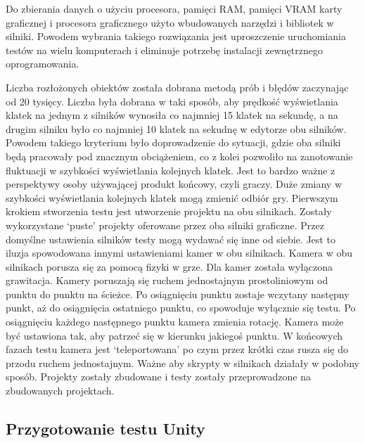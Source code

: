 \documentclass[12pt,twoside]{article}
\begin{document}
Do zbierania danych o użyciu procesora, pamięci RAM, pamięci VRAM karty
graficznej i procesora graficznego użyto wbudowanych narzędzi i bibliotek w
silniki. Powodem wybrania takiego rozwiązania jest uproszczenie uruchomiania
testów na wielu komputerach i eliminuje potrzebę instalacji zewnętrznego
oprogramowania. 


Liczba rozłożonych obiektów została dobrana metodą prób i błędów zaczynając od
20 tysięcy. Liczba była dobrana w taki sposób, aby prędkość wyświetlania klatek
na jednym z silników wynosiła co najmniej 15 klatek na sekundę, a na drugim
silniku było co najmniej 10 klatek na sekudnę w edytorze obu silników. Powodem
takiego kryterium było doprowadzenie do sytuacji, gdzie oba silniki będą
pracowały pod znacznym obciążeniem, co z kolei pozwoliło na zanotowanie
fluktuacji w szybkości wyświetlania kolejnych klatek. Jest to bardzo ważne z
perspektywy osoby używającej produkt końcowy, czyli graczy. Duże zmiany w
szybkości wyświetlania kolejnych klatek mogą zmienić odbiór gry. Pierwszym
krokiem stworzenia testu jest utworzenie projektu na obu silnikach. Zostały
wykorzystane ‘puste’ projekty oferowane przez oba silniki graficzne. Przez
domyślne ustawienia silników testy mogą wydawać się inne od siebie. Jest to
iluzja spowodowana innymi ustawieniami kamer w obu silnikach. Kamera w obu
silnikach porusza się za pomocą fizyki w grze. Dla kamer została wyłączona
grawitacja.  Kamery poruszają się ruchem jednostajnym prostoliniowym od punktu
do punktu na ścieżce. Po osiągnięciu punktu zostaje wczytany następny punkt, aż
do osiągnięcia ostatniego punktu, co spowoduje wyłącznie się testu. Po
osiągnięciu każdego następnego punktu kamera zmienia rotację. Kamera może być
ustawiona tak, aby patrzeć się w kierunku jakiegoś punktu. W końcowych fazach
testu kamera jest ‘teleportowana’ po czym przez krótki czas rusza się do przodu
ruchem jednostajnym. Ważne aby skrypty w silnikach działały w podobny sposób.
Projekty zostały zbudowane i testy zostały przeprowadzone na zbudowanych
projektach. 


\subsection{Przygotowanie testu Unity}
\end{document}
